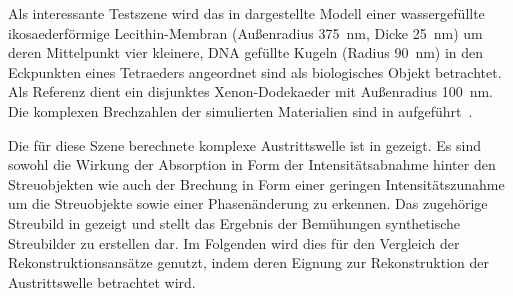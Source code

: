 Als interessante Testszene wird das in  dargestellte Modell einer wassergefüllte ikosaederförmige Lecithin-Membran (Außenradius \SI{375}{nm}, Dicke \SI{25}{nm}) um deren Mittelpunkt vier kleinere, DNA gefüllte Kugeln (Radius \SI{90}{nm}) in den Eckpunkten eines Tetraeders angeordnet sind als biologisches Objekt betrachtet. Als Referenz dient ein disjunktes Xenon-Dodekaeder mit Außenradius \SI{100}{nm}. Die komplexen Brechzahlen der simulierten Materialien sind in  aufgeführt~\cite{henke,bergh2008,milo2015}.

Die für diese Szene berechnete komplexe Austrittswelle ist in  gezeigt. Es sind sowohl die Wirkung der Absorption in Form der Intensitätsabnahme hinter den Streuobjekten wie auch der Brechung in Form einer geringen Intensitätszunahme um die Streuobjekte sowie einer Phasenänderung zu erkennen. Das zugehörige Streubild in  gezeigt und stellt das Ergebnis der Bemühungen synthetische Streubilder zu erstellen dar. Im Folgenden wird dies für den Vergleich der Rekonstruktionsansätze genutzt, indem deren Eignung zur Rekonstruktion der Austrittswelle betrachtet wird.

